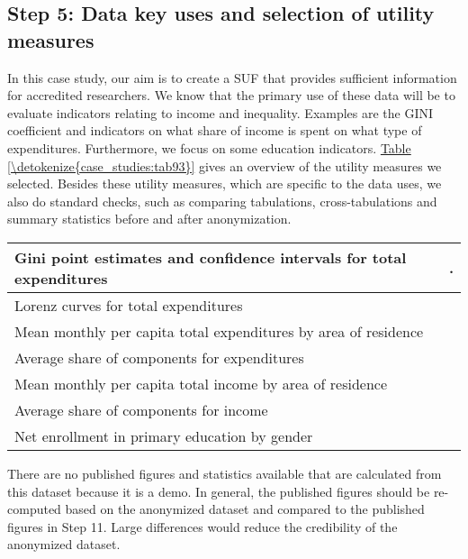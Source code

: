 \documentclass[letterpaper,10pt,english]{sphinxmanual}
\begin{document}
\subsection{Step 5: Data key uses and selection of utility measures}
\label{\detokenize{case_studies:step-5-data-key-uses-and-selection-of-utility-measures}}
In this case study, our aim is to create a SUF that provides sufficient
information for accredited researchers. We know that the primary use of
these data will be to evaluate indicators relating to income and
inequality. Examples are the GINI coefficient and indicators on what
share of income is spent on what type of expenditures. Furthermore, we
focus on some education indicators. \hyperref[\detokenize{case_studies:tab93}]{Table \ref{\detokenize{case_studies:tab93}}} gives an overview of the
utility measures we selected. Besides these utility measures, which are
specific to the data uses, we also do standard checks, such as comparing
tabulations, cross-tabulations and summary statistics before and after
anonymization.


\begin{savenotes}\sphinxattablestart
\centering
{}
\label{\detokenize{case_studies:tab93}}\label{\detokenize{case_studies:id17}}
\sphinxaftercaption
\begin{tabulary}{\linewidth}[t]{|T|T|}
\hline

Gini point estimates and confidence intervals for total expenditures
&
.
\\
\hline
Lorenz curves for total expenditures
&\\
\hline
Mean monthly per capita total expenditures by area of residence
&\\
\hline
Average share of components for expenditures
&\\
\hline
Mean monthly per capita total income by area of residence
&\\
\hline
Average share of components for income
&\\
\hline
Net enrollment in primary education by gender
&\\
\hline
\end{tabulary}
\par
\sphinxattableend\end{savenotes}

There are no published figures and statistics available that are
calculated from this dataset because it is a demo. In general, the
published figures should be re-computed based on the anonymized dataset
and compared to the published figures in Step 11. Large differences
would reduce the credibility of the anonymized dataset.
\end{document}
